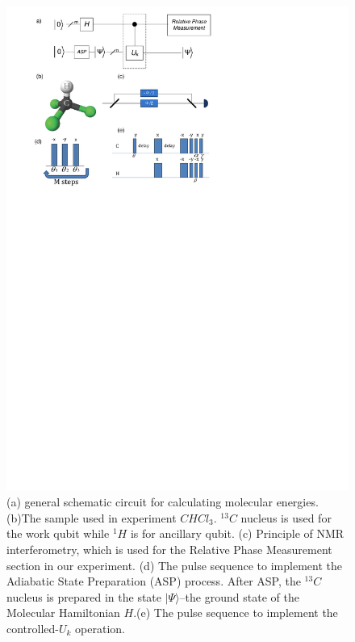 \def\CTeXPreproc{Created by ctex v0.2.12, don't edit!}\documentclass[twocolumn,showpacs,twoside,10pt,superscriptaddress,prl]{revtex4}
\begin{document}
\begin{figure}[htb]
\begin{center}
\includegraphics[width= 0.99\columnwidth]{circuit_exp}
\end{center}
\caption{(a) general schematic circuit for calculating molecular
energies. (b)The sample used in experiment $CHCl_{3}$. $^{13}C$
nucleus is used for the work qubit while $^{1}H$ is for ancillary
qubit. (c) Principle of NMR interferometry, which is used for the
Relative Phase Measurement section in our experiment. (d) The pulse
sequence to implement the Adiabatic State Preparation (ASP) process.
After ASP, the $^{13}C$ nucleus is prepared in the state
$|\Psi\rangle$--the ground state of the Molecular Hamiltonian
$H$.(e) The pulse sequence to implement the controlled-$U_k$
operation.}\label{circuit_exp}
\end{figure}
\end{document}
